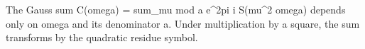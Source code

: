 The Gauss sum C(omega) = sum_{mu mod a} e^{2pi i S(mu^2 omega)} depends only on omega and its denominator a. Under multiplication by a square, the sum transforms by the quadratic residue symbol.
